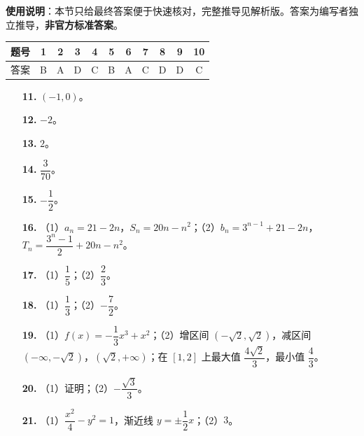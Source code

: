 
\begin{gknotice}
\textbf{使用说明}：本节只给最终答案便于快速核对，完整推导见解析版。答案为编写者独立推导，\textbf{非官方标准答案}。
\end{gknotice}

\begin{center}\begin{tabular}{ccccccccccc}
\toprule
题号 & 1 & 2 & 3 & 4 & 5 & 6 & 7 & 8 & 9 & 10 \\
\midrule
答案 & B & A & D & C & B & A & C & D & D & C \\
\bottomrule
\end{tabular}\end{center}

\begin{itemize}[leftmargin=2.6em]
  \item[\textbf{11.}] $(-1,0)$。
  \item[\textbf{12.}] $-2$。
  \item[\textbf{13.}] $2$。
  \item[\textbf{14.}] $\dfrac{3}{70}$。
  \item[\textbf{15.}] $-\dfrac12$。
\end{itemize}

\begin{itemize}[leftmargin=2.6em]
  \item[\textbf{16.}] （1）$a_n=21-2n$，$S_n=20n-n^2$；（2）$b_n=3^{n-1}+21-2n$，$T_n=\dfrac{3^n-1}{2}+20n-n^2$。
  \item[\textbf{17.}] （1）$\dfrac15$；（2）$\dfrac23$。
  \item[\textbf{18.}] （1）$\dfrac13$；（2）$-\dfrac72$。
  \item[\textbf{19.}] （1）$f(x)=-\dfrac13x^3+x^2$；（2）增区间 $(-\sqrt2,\sqrt2)$，减区间 $(-\infty,-\sqrt2)$，$(\sqrt2,+\infty)$；在 $[1,2]$ 上最大值 $\dfrac{4\sqrt2}{3}$，最小值 $\dfrac43$。
  \item[\textbf{20.}] （1）证明；（2）$-\dfrac{\sqrt3}{3}$。
  \item[\textbf{21.}] （1）$\dfrac{x^2}{4}-y^2=1$，渐近线 $y=\pm\dfrac12x$；（2）$3$。
\end{itemize}
